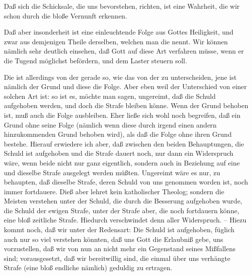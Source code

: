 \begin{aufza}
\item Daß sich die Schicksale, die uns bevorstehen, richten, ist eine Wahrheit, die wir schon durch die bloße Vernunft erkennen.
\item Daß aber insonderheit  ist eine einleuchtende Folge aus Gottes Heiligkeit, und zwar aus demjenigen Theile derselben, welchen man die  nennt. Wir können nämlich sehr deutlich einsehen, daß Gott auf diese Art verfahren müsse, wenn er die Tugend möglichst befördern, und dem Laster steuern soll.
\item Die  ist allerdings von der  gerade so, wie das  von der  zu unterscheiden, jene ist nämlich der Grund und diese die Folge. Aber eben weil der Unterschied von einer solchen Art ist: so ist es, möchte man sagen, ungereimt, daß die Schuld aufgehoben werden, und doch die Strafe bleiben könne. Wenn der Grund behoben ist, muß auch die Folge ausbleiben. Eher ließe sich wohl noch begreifen, daß ein Grund ohne seine Folge (nämlich wenn diese durch irgend einen andern hinzukommenden Grund behoben wird), als daß die Folge ohne ihren Grund bestehe. Hierauf erwiedere ich aber, daß zwischen den beiden Behauptungen, die Schuld ist aufgehoben und die Strafe dauert noch, nur dann ein Widerspruch wäre, wenn beide nicht nur ganz eigentlich, sondern auch in Beziehung auf eine und dieselbe Strafe ausgelegt werden müßten. Ungereimt wäre es nur, zu behaupten, daß dieselbe Strafe, deren Schuld von uns genommen worden ist, noch immer fortdauere. Dieß aber lehret kein katholischer Theolog; sondern die Meisten verstehen unter der Schuld, die durch die Besserung aufgehoben wurde, die Schuld der ewigen Strafe, unter der Strafe aber, die noch fortdauern könne, eine bloß zeitliche Strafe. Hiedurch verschwindet denn aller Widerspruch. -- Hiezu kommt noch, daß wir unter der Redensart: Die Schuld ist aufgehoben, füglich auch nur so viel verstehen könnten, daß uns Gott die Erlaubniß gebe, uns vorzustellen, daß wir von nun an nicht mehr ein Gegenstand seines Mißfallens sind; vorausgesetzt, daß wir bereitwillig sind, die einmal über uns verhängte Strafe (eine bloß endliche nämlich) geduldig zu ertragen.

\end{aufza}
